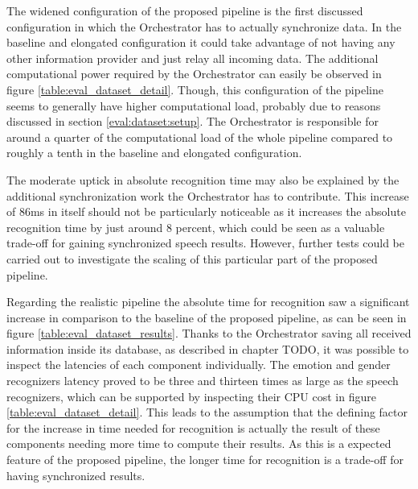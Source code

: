 { %
The widened configuration of the proposed pipeline is the first discussed configuration in which the Orchestrator has to actually synchronize data. 
In the baseline and elongated configuration it could take advantage of not having any other information provider and just relay all incoming data.
The additional computational power required by the Orchestrator can easily be observed in figure \ref{table:eval_dataset_detail}.
Though, this configuration of the pipeline seems to generally have higher computational load, probably due to reasons discussed in section \ref{eval:dataset:setup}.
The Orchestrator is responsible for around a quarter of the computational load of the whole pipeline compared to roughly a tenth in the baseline and elongated configuration.

The moderate uptick in absolute recognition time may also be explained by the additional synchronization work the Orchestrator has to contribute. 
This increase of 86ms in itself should not be particularly noticeable as it increases the absolute recognition time by just around 8 percent, which could be seen as a valuable trade-off for gaining synchronized speech results. 
However, further tests could be carried out to investigate the scaling of this particular part of the proposed pipeline.
}

{ %
Regarding the realistic pipeline the absolute time for recognition saw a significant increase in comparison to the baseline of the proposed pipeline, as can be seen in figure \ref{table:eval_dataset_results}.
Thanks to the Orchestrator saving all received information inside its database, as described in chapter TODO, it was possible to inspect the latencies of each component individually.
The emotion and gender recognizers latency proved to be three and thirteen times as large as the speech recognizers, which can be supported by inspecting their CPU cost in figure \ref{table:eval_dataset_detail}.
This leads to the assumption that the defining factor for the increase in time needed for recognition is actually the result of these components needing more time to compute their results.
As this is a expected feature of the proposed pipeline, the longer time for recognition is a trade-off for having synchronized results.
}


